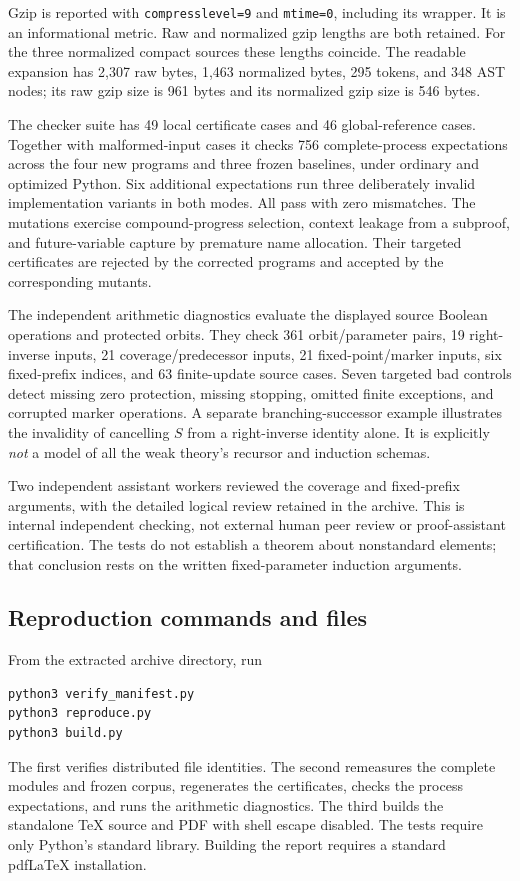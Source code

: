 \documentclass[11pt]{article}
\theoremstyle{definition}\newtheorem{definition}[theorem]{Definition}
\begin{document}
Gzip is reported with \texttt{compresslevel=9} and \texttt{mtime=0},
including its wrapper. It is an informational metric. Raw and normalized
gzip lengths are both retained. For the three normalized compact sources
these lengths coincide. The readable expansion has 2,307 raw bytes,
1,463 normalized bytes, 295 tokens, and 348 AST nodes; its raw gzip size
is 961 bytes and its normalized gzip size is 546 bytes.

The checker suite has 49 local certificate cases and 46 global-reference
cases. Together with malformed-input cases it checks 756 complete-process
expectations across the four new programs and three frozen baselines,
under ordinary and optimized Python. Six additional expectations run
three deliberately invalid implementation variants in both modes. All pass with zero
mismatches. The mutations exercise compound-progress selection, context
leakage from a subproof, and future-variable capture by premature name
allocation. Their targeted certificates are rejected by the
corrected programs and accepted by the corresponding mutants.

The independent arithmetic diagnostics evaluate the displayed source
Boolean operations and protected orbits. They check 361 orbit/parameter
pairs, 19 right-inverse inputs, 21 coverage/predecessor inputs, 21
fixed-point/marker inputs, six fixed-prefix indices, and 63 finite-update
source cases. Seven targeted bad controls detect missing zero protection,
missing stopping, omitted finite exceptions, and corrupted marker
operations. A separate branching-successor example illustrates the
invalidity of cancelling $S$ from a right-inverse identity alone. It is
explicitly \emph{not} a model of all the weak theory's recursor and
induction schemas.

Two independent assistant workers reviewed the coverage and fixed-prefix
arguments, with the detailed logical review retained in the archive.
This is internal independent checking, not external human peer review
or proof-assistant certification. The tests do not establish a theorem
about nonstandard elements; that conclusion rests on the written
fixed-parameter induction arguments.

\subsection{Reproduction commands and files}
From the extracted archive directory, run
\begin{verbatim}
python3 verify_manifest.py
python3 reproduce.py
python3 build.py
\end{verbatim}
The first verifies distributed file identities. The second remeasures the
complete modules and frozen corpus, regenerates the certificates, checks
the process expectations, and runs the arithmetic diagnostics. The third
builds the standalone TeX source and PDF with shell escape disabled.
The tests require only Python's standard library. Building the report
requires a standard pdfLaTeX installation.
\end{document}
